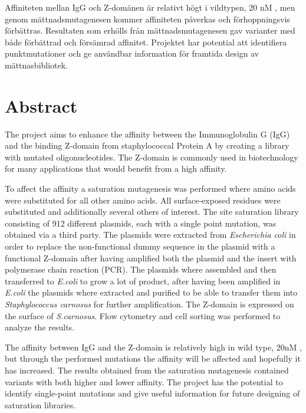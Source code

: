 \documentclass{article}
\begin{document}
		Affiniteten mellan IgG och Z-domänen är relativt högt i vildtypen, 20 nM \cite{john}, men genom mättnadsmutagenesen kommer affiniteten påverkas och förhoppningsvis förbättras. Resultaten som erhölls från mättnadsmutagenesen gav varianter med både förbättrad och försämrad affinitet. Projektet har potential att identifiera punktmutationer och ge användbar information för framtida design av mättnasbibliotek.
	
	\newpage
	\section*{Abstract}
		The project aims to enhance the affinity between the Immunoglobulin G (IgG) and the binding Z-domain from staphylococcal Protein A by creating a library with mutated oligonucleotides. The Z-domain is commonly used in biotechnology for many applications that would benefit from a high affinity. 
		
		To affect the affinity a saturation mutagenesis was performed where amino acids were substituted for all other amino acids. All surface-exposed residues were substituted and additionally several others of interest. The site saturation library consisting of 912 different plasmids, each with a single point mutation, was obtained via a third party. The plasmids were extracted from \textit{Escherichia coli} in order to replace the non-functional dummy sequence in the plasmid with a functional Z-domain after having amplified both the plasmid and the insert with polymerase chain reaction (PCR). The plasmids where assembled and then transferred to \textit{E.coli} to grow a lot of product, after having been amplified in \textit{E.coli} the plasmids where extracted and purified to be able to transfer them into \textit{Staphylococcus carnosus} for further amplification. The Z-domain is expressed on the surface of \textit{S.carnosus}. Flow cytometry and cell sorting was performed to analyze the results. 
		
		The affinity between IgG and the Z-domain is relatively high in wild type, 20nM \cite{john}, but through the performed mutations the affinity will be affected and hopefully it has increased. The results obtained from the saturation mutagenesis contained variants with both higher and lower affinity. The project has the potential to identify single-point mutations and give useful information for future designing of saturation libraries. 
	
	\newpage
	\tableofcontents
	
\end{document}

